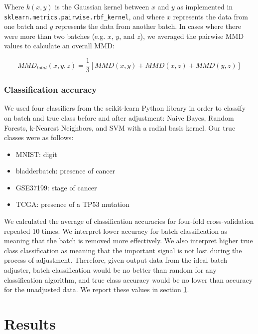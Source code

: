 \documentclass[notitlepage]{article}
\begin{document}
Where $k(x, y)$ is the Gaussian kernel between $x$ and $y$ as implemented in \texttt{sklearn.metrics.pairwise.rbf\_kernel}, and where $x$ represents the data from one batch and $y$ represents the data from another batch.
In cases where there were more than two batches (e.g. $x$, $y$, and $z$), we averaged the pairwise MMD values to calculate an overall MMD:

\begin{equation}
	\label{mmd-mean}
	MMD_{total}(x, y, z) = \frac{1}{3}[MMD(x, y) + MMD(x, z) + MMD(y, z)]
\end{equation}

\subsubsection{Classification accuracy}

We used four classifiers from the scikit-learn Python library in order to classify on batch and true class before and after adjustment: Naive Bayes, Random Forests, k-Nearest Neighbors, and SVM with a radial basis kernel.
Our true classes were as follows:

\begin{itemize}
	\item MNIST: digit
	\item bladderbatch: presence of cancer
	\item GSE37199: stage of cancer
	\item TCGA: presence of a TP53 mutation
\end{itemize}

We calculated the average of classification accuracies for four-fold cross-validation repeated 10 times.
We interpret lower accuracy for batch classification as meaning that the batch is removed more effectively.
We also interpret higher true class classification as meaning that the important signal is not lost during the process of adjustment.
Therefore, given output data from the ideal batch adjuster, batch classification would be no better than random for any classification algorithm, and true class accuracy would be no lower than accuracy for the unadjusted data.
We report these values in section \ref{results}.

\section{Results} \label{results}

\end{document}
